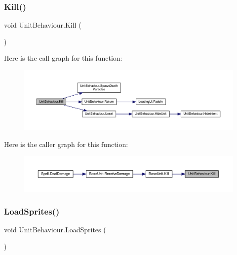 \subsubsection{\texorpdfstring{Kill()}{Kill()}}
{\footnotesize\ttfamily void Unit\+Behaviour.\+Kill (\begin{DoxyParamCaption}{ }\end{DoxyParamCaption})}

Here is the call graph for this function\+:\nopagebreak
\begin{figure}[H]
\begin{center}
\leavevmode
\includegraphics[width=350pt]{class_unit_behaviour_a9a32f3234ea6b89f686c6cd55d924348_cgraph}
\end{center}
\end{figure}
Here is the caller graph for this function\+:\nopagebreak
\begin{figure}[H]
\begin{center}
\leavevmode
\includegraphics[width=350pt]{class_unit_behaviour_a9a32f3234ea6b89f686c6cd55d924348_icgraph}
\end{center}
\end{figure}
\mbox{\label{class_unit_behaviour_a544570d55168594c1e4502dbe5c9d6a8}} 
\subsubsection{\texorpdfstring{LoadSprites()}{LoadSprites()}}
{\footnotesize\ttfamily void Unit\+Behaviour.\+Load\+Sprites (\begin{DoxyParamCaption}{ }\end{DoxyParamCaption})}

